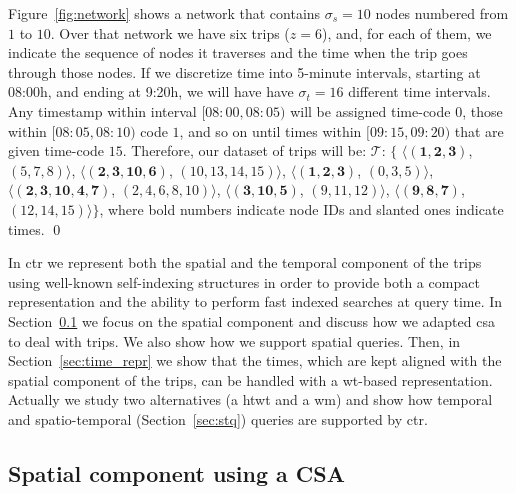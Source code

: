 	\begin{example} \label{exp:ctr}
	Figure~\ref{fig:network} shows a network that contains $\sigma_s=10$ nodes 
	numbered from $1$ to $10$. Over that network we have six trips ($z=6$),
	and, for each of them, we indicate the sequence of nodes it traverses
	and the time when the trip goes through those nodes. If we discretize time into
	5-minute intervals, starting at 08:00h, and ending at 9:20h, we will have
	have $\sigma_t=16$ different time intervals. Any timestamp within
	interval $\mathit{[08\!:\!00,08\!:\!05)}$ will
	be assigned time-code $0$, those within $\mathit{[08\!:\!05,08\!:\!10)}$ code $1$, and so on until
	times within $\mathit{[09\!:\!15,09\!:\!20)}$ that are given time-code $15$.  
	Therefore, our dataset of trips will be: 
	$\mathcal{T}$: $\{$%
	$\langle (\mathbf{1,2,3     })$, $(\mathit{5,7,8})                     \rangle$, 
	$\langle (\mathbf{2,3,10,6  })$, $(\mathit{10,13,14,15})           \rangle$, 
	$\langle (\mathbf{1,2,3     })$, $(\mathit{0,3,5})                     \rangle$, 
	$\langle (\mathbf{2,3,10,4,7})$, $(\mathit{2,4,6,8,10}) \rangle$, 
	$\langle (\mathbf{3,10,5    })$, $(\mathit{9,11,12})                     \rangle$, 
	$\langle (\mathbf{9,8,7     })$, $(\mathit{12,14,15})                    \rangle$$\}$, 
	where bold numbers indicate node IDs and slanted ones indicate times. \qed
	\end{example}

	In \gls{ctr} we represent both the spatial and the temporal component of the trips using well-known
	self-indexing structures in order to provide both a compact representation and the ability to 
	perform fast indexed searches at query time. In Section~\ref{sec:transnet_repr} we focus on the
	spatial component and discuss how we adapted  \gls{csa} to deal with trips. We also
	show how we support spatial queries. Then, in Section~\ref{sec:time_repr} we show that the times,
	which are kept aligned with the spatial component of the trips, can be handled with   
	a \gls{wt}-based representation. Actually we study two alternatives (a \gls{htwt} and a \gls{wm}) 
	and show how temporal and spatio-temporal (Section~\ref{sec:stq}) queries are supported by \gls{ctr}.

	\subsection{Spatial component using a CSA}
	\label{sec:transnet_repr}

